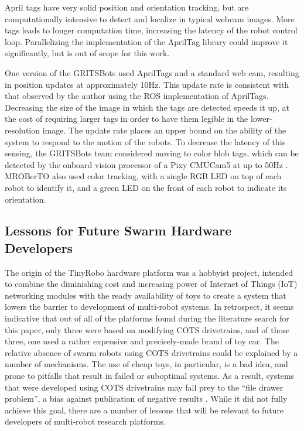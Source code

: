 \documentclass[]{article}
\begin{document}
April tags have very solid position and orientation tracking, but are computationally intensive to detect and localize in typical webcam images. 
More tags leads to longer computation time, increasing the latency of the robot control loop. 
Parallelizing the implementation of the AprilTag library could improve it significantly, but is out of scope for this work. 

One version of the GRITSBots used AprilTags and a standard web cam, resulting in position updates at approximately 10Hz. 
This update rate is consistent with that observed by the author using the ROS implementation of AprilTags. 
Decreasing the size of the image in which the tags are detected speeds it up, at the cost of requiring larger tags in order to have them legible in the lower-resolution image. 
The update rate places an upper bound on the ability of the system to respond to the motion of the robots. 
To decrease the latency of this sensing, the GRITSBots team considered moving to color blob tags, which can be detected by the onboard vision processor of a Pixy CMUCam5 at up to 50Hz \cite{PickemGrits2014}. 
MROBerTO also used color tracking, with a single RGB LED on top of each robot to identify it, and a green LED on the front of each robot to indicate its orientation. 

\subsection{Lessons for Future Swarm Hardware Developers}

The origin of the TinyRobo hardware platform was a hobbyist project, intended to combine the diminishing cost and increasing power of Internet of Things (IoT) networking modules with the ready availability of toys to create a system that lowers the barrier to development of multi-robot systems.
In retrospect, it seems indicative that out of all of the platforms found during the literature search for this paper, only three were based on modifying COTS drivetrains, and of those three, one used a rather expensive and precisely-made brand of toy car. 
The relative absence of swarm robots using COTS drivetrains could be explained by a number of mechanisms.
The use of cheap toys, in particular, is a bad idea, and prone to pitfalls that result in failed or suboptimal systems.
As a result, systems that were developed using COTS drivetrains may fall prey to the ``file drawer problem'', a bias against publication of negative results \cite{file_drawer_prob_10.2307/2684823}.
While it did not fully achieve this goal, there are a number of lessons that will be relevant to future developers of multi-robot research platforms. 
\end{document}
